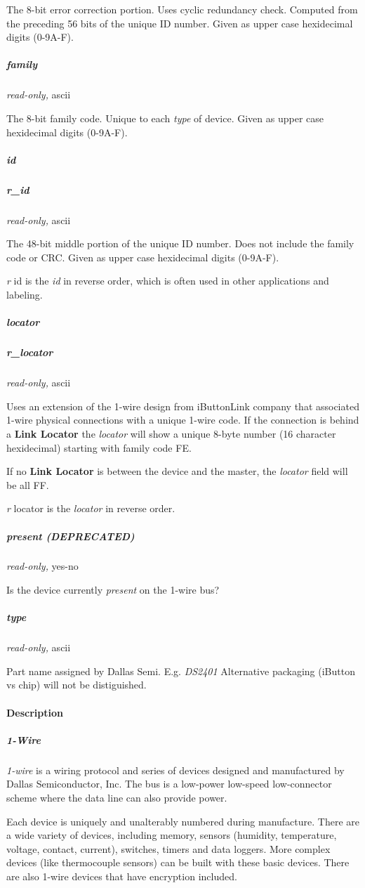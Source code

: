 The 8-bit error correction portion. Uses cyclic redundancy check. Computed
from the preceding 56 bits of the unique ID number. Given as upper case
hexidecimal digits (0-9A-F). 
\subparagraph*{family}\textit{read-only,} ascii 

The 8-bit family code. Unique to each \textit{type} of device. Given as upper case
hexidecimal digits (0-9A-F). 
\subparagraph*{id}
\subparagraph*{r\_id}\textit{read-only,} ascii 

The 48-bit middle portion of the unique ID number. Does not include the family
code or CRC. Given as upper case hexidecimal digits (0-9A-F). 

\textit{r} id is the \textit{id} in reverse order, which is often used in other applications
and labeling. 
\subparagraph*{locator}
\subparagraph*{r\_locator}\textit{read-only,} ascii 

Uses an extension of the 1-wire design from iButtonLink company that associated
1-wire physical connections with a unique 1-wire code. If the connection is
behind a \textbf{Link Locator} the \textit{locator} will show a unique 8-byte number (16 character
hexidecimal) starting with family code FE. 

If no \textbf{Link Locator} is between the device and the master, the \textit{locator} field
will be all FF. 

\textit{r} locator is the \textit{locator} in reverse order. 
\subparagraph*{present (DEPRECATED)}\textit{read-only,}
yes-no 

Is the device currently \textit{present} on the 1-wire bus? 
\subparagraph*{type}\textit{read-only,} ascii 

Part name assigned by Dallas Semi. E.g. \textit{DS2401} Alternative packaging (iButton
vs chip) will not be distiguished.  
\paragraph*{Description}
          
\subparagraph*{1-Wire}\textit{1-wire}  is
a wiring protocol and series of devices designed and manufactured by Dallas
Semiconductor, Inc. The bus is a low-power low-speed low-connector scheme where
the data line can also provide power. 

Each device is uniquely and unalterably
numbered during manufacture. There are a wide variety of devices, including
memory, sensors (humidity, temperature, voltage, contact, current), switches,
timers and data loggers. More complex devices (like thermocouple sensors)
can be built with these basic devices. There are also 1-wire devices that
have encryption included. 

